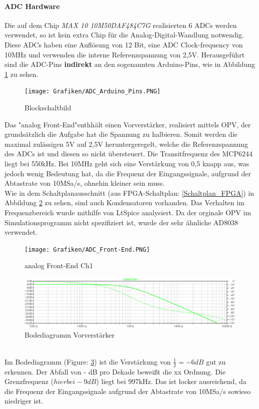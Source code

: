 \documentclass[a4paper,12pt]{article}
\begin{document}
\paragraph{ADC Hardware}
Die auf dem Chip \textit{MAX 10 10M50DAF484C7G} realisierten 6 ADCs werden verwendet, so ist kein extra Chip für die Analog-Digital-Wandlung notwendig. Diese ADCs haben eine Auflösung von 12 Bit, eine ADC Clock-frequency von 10MHz und verwenden die interne Referenzspannung von 2,5V. Herausgeführt sind die ADC-Pins \textbf{indirekt} an den sogenannten Arduino-Pins, wie in Abbildung \ref{ADC_Blockschaltbild} zu sehen.
\begin{figure}[!h]
\begin{center}
\texttt{[image: Grafiken/ADC\_Arduino\_Pins.PNG]}
\caption{Blockschaltbild}
\label{ADC_Blockschaltbild}
\end{center}
\end{figure}
Das "analog Front-End"enthhält einen Vorverstärker, realisiert mittels OPV, der grundsätzlich die Aufgabe hat die Spannung zu halbieren. Somit werden die maximal zulässigen 5V auf 2,5V heruntergeregelt, welche die Referenzspannung des ADCs ist und diesen so nicht übersteuert. Die Transitfrequenz des MCP6244 liegt bei 550kHz. Bei 10MHz geht sich eine Verstärkung von 0,5 knapp aus, was jedoch wenig Bedeutung hat, da die Frequenz der Eingangssignale, aufgrund der Abtastrate von 10MSa/s, ohnehin kleiner sein muss. \\Wie in dem Schaltplanausschnitt (aus FPGA-Schaltplan: \ref{Schaltplan_FPGA}) in Abbildung \ref{Front-End_Schaltung} zu sehen, sind auch Kondensatoren vorhanden. Das Verhalten im Frequenzbereich wurde mithilfe von LtSpice analysiert. Da der orginale OPV im Simulationsprogramm nicht spezifiziert ist, wurde der sehr ähnliche AD8038 verwendet.
\begin{figure}[!h]
\begin{center}
\texttt{[image: Grafiken/ADC\_Front-End.PNG]}
\caption{analog Front-End Ch1}
\label{Front-End_Schaltung}
\end{center}
\end{figure}
\begin{figure}[!h]
\begin{center}
\includegraphics[width=15cm]{Grafiken/ADC_Front-End_Bode.PNG}
\caption{Bodediagramm Vorverstärker}
\label{Front-End_Bode}
\end{center}
\end{figure}
\\Im Bodediagramm (Figure: \ref{Front-End_Bode}) ist die Verstärkung von $\frac{1}{2} = -6dB$ gut zu erkennen. Der Abfall von - dB pro Dekade beweißt die xx Ordnung. Die Grenzfrequenz ($hier bei -9dB$) liegt bei 997kHz. Das ist locker ausreichend, da die Frequenz der Eingangssignale aufgrund der Abtastrate von 10MSa/s sowieso niedriger ist.
\end{document}
